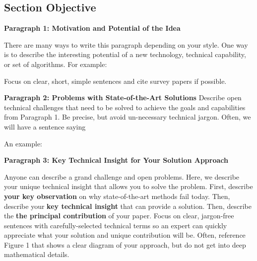 \subsection{Section Objective}



\textbf{Paragraph 1: Motivation and Potential of the Idea}

There are many ways to write this paragraph depending on your style.
One way is to describe the interesting potential of a new technology, technical capability, or set of algorithms. For example: 

\begin{quote}
\end{quote}

Focus on clear, short, simple sentences and cite survey papers if possible.

\textbf{Paragraph 2: Problems with State-of-the-Art Solutions}
Describe open technical challenges that need to be solved to achieve the goals and capabilities from Paragraph 1. Be precise, but avoid un-necessary technical jargon. Often, we will have a sentence saying 

An example: 
\begin{quote}
\end{quote}

\textbf{Paragraph 3: Key Technical Insight for Your Solution Approach}

Anyone can describe a grand challenge and open problems. Here, we describe your unique technical insight that allows you to solve the problem. First, describe \textbf{your key observation} on why state-of-the-art methods fail today. Then, describe your \textbf{key technical insight} that can provide a solution.
Then, describe the \textbf{the principal contribution} of your paper. 
Focus on clear, jargon-free sentences with carefully-selected technical terms so an expert can quickly appreciate what your solution and unique contribution will be. Often, reference Figure 1 that shows a clear diagram of your approach, but do not get into deep mathematical details. 

